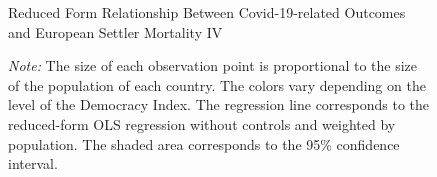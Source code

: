 \begin{figure}[H]
\centering
\caption{Reduced Form Relationship Between Covid-19-related Outcomes and European Settler Mortality IV}
\centering
\label{fig:reduced-form}
  \hspace{1em}%
  
  \caption*{\textit{Note:} The size of each observation point is proportional to the size of the population of each country. The colors vary depending on the level of the Democracy Index. The regression line corresponds to the reduced-form OLS regression without controls and weighted by population. The shaded area corresponds to the 95\% confidence interval.}
  
\end{figure}